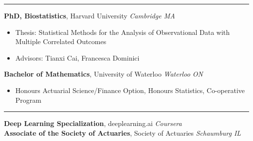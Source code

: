 \documentclass[10pt,english]{report}
\begin{document}
\vspace{5mm}

{\par}
\vspace{1mm}\hrule
\vspace{1mm}

\textbf{PhD, Biostatistics}, Harvard University \hfill \textit{Cambridge MA} \texttt{}
\begin{itemize}
\item Thesis: Statistical Methods for the Analysis of Observational Data with Multiple Correlated Outcomes
\item Advisors: Tianxi Cai, Francesca Dominici
\end{itemize}

\vspace{1mm}

\textbf{Bachelor of Mathematics}, University of Waterloo \hfill \textit{Waterloo ON} \texttt{}
\begin{itemize}
\item Honours Actuarial Science/Finance Option, Honours Statistics, Co-operative
Program
\end{itemize}

\vspace{1mm}
\vspace{1mm}\hrule
\vspace{1mm}

\textbf{Deep Learning Specialization}, deeplearning.ai \hfill \textit{Coursera} \texttt{} \\
\textbf{Associate of the Society of Actuaries}, Society of Actuaries \hfill \textit{Schaumburg IL} \texttt{}
\end{document}
